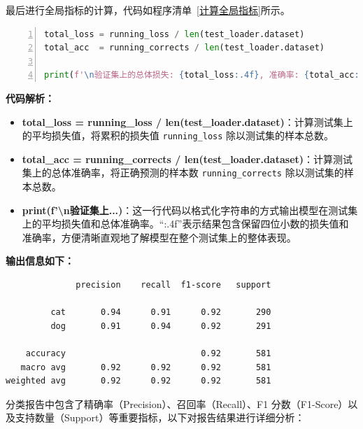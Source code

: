 最后进行全局指标的计算，代码如程序清单~\ref{计算全局指标}所示。
\begin{lstlisting}[language={python},label={计算全局指标},caption={计算全局指标}, basicstyle=\footnotesize\ttfamily, breaklines=true, numbers=left, frame=single]
total_loss = running_loss / len(test_loader.dataset)
total_acc  = running_corrects / len(test_loader.dataset)

print(f'\n验证集上的总体损失: {total_loss:.4f}, 准确率: {total_acc:.4f}')
\end{lstlisting}
\textbf{代码解析：}
\begin{itemize}
    \item \textbf{total\_loss = running\_loss / len(test\_loader.dataset)}：计算测试集上的平均损失值，将累积的损失值 \texttt{running\_loss} 除以测试集的样本总数。

    \item \textbf{total\_acc = running\_corrects / len(test\_loader.dataset)}：计算测试集上的总体准确率，将正确预测的样本数 \texttt{running\_corrects} 除以测试集的样本总数。

    \item \textbf{print(f'\textbackslash n验证集上...)}：这一行代码以格式化字符串的方式输出模型在测试集上的平均损失值和总体准确率。“:.4f”表示结果包含保留四位小数的损失值和准确率，方便清晰直观地了解模型在整个测试集上的整体表现。
\end{itemize}

\textbf{输出信息如下：}
\vspace{-2mm} %
\begin{tcolorbox}[colframe=blue!50!black, colback=blue!10!white, coltitle=black, sharp corners, top=0mm, bottom=0mm, boxrule=0.8mm, breakable, enhanced]
\begin{verbatim}
              precision    recall  f1-score   support

         cat       0.94      0.91      0.92       290
         dog       0.91      0.94      0.92       291

    accuracy                           0.92       581
   macro avg       0.92      0.92      0.92       581
weighted avg       0.92      0.92      0.92       581
\end{verbatim}
\end{tcolorbox}

分类报告中包含了精确率（Precision）、召回率（Recall）、F1 分数（F1-Score）以及支持数量（Support）等重要指标，以下对报告结果进行详细分析：

